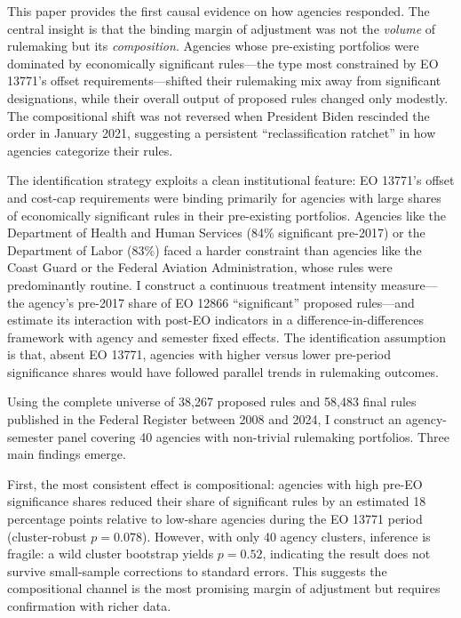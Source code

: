 \documentclass[12pt]{article}
\begin{document}
This paper provides the first causal evidence on how agencies responded. The central insight is that the binding margin of adjustment was not the \textit{volume} of rulemaking but its \textit{composition}. Agencies whose pre-existing portfolios were dominated by economically significant rules---the type most constrained by EO 13771's offset requirements---shifted their rulemaking mix away from significant designations, while their overall output of proposed rules changed only modestly. The compositional shift was not reversed when President Biden rescinded the order in January 2021, suggesting a persistent ``reclassification ratchet'' in how agencies categorize their rules.

The identification strategy exploits a clean institutional feature: EO 13771's offset and cost-cap requirements were binding primarily for agencies with large shares of economically significant rules in their pre-existing portfolios. Agencies like the Department of Health and Human Services (84\% significant pre-2017) or the Department of Labor (83\%) faced a harder constraint than agencies like the Coast Guard or the Federal Aviation Administration, whose rules were predominantly routine. I construct a continuous treatment intensity measure---the agency's pre-2017 share of EO 12866 ``significant'' proposed rules---and estimate its interaction with post-EO indicators in a difference-in-differences framework with agency and semester fixed effects. The identification assumption is that, absent EO 13771, agencies with higher versus lower pre-period significance shares would have followed parallel trends in rulemaking outcomes.

Using the complete universe of 38,267 proposed rules and 58,483 final rules published in the Federal Register between 2008 and 2024, I construct an agency-semester panel covering 40 agencies with non-trivial rulemaking portfolios. Three main findings emerge.

First, the most consistent effect is compositional: agencies with high pre-EO significance shares reduced their share of significant rules by an estimated 18 percentage points relative to low-share agencies during the EO 13771 period (cluster-robust $p = 0.078$). However, with only 40 agency clusters, inference is fragile: a wild cluster bootstrap yields $p = 0.52$, indicating the result does not survive small-sample corrections to standard errors. This suggests the compositional channel is the most promising margin of adjustment but requires confirmation with richer data.
\end{document}
